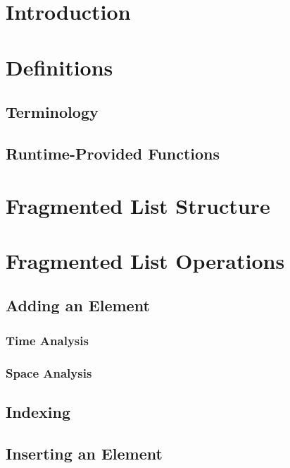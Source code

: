 \documentclass{article}
\begin{document}
	\begin{abstract}
	\end{abstract}

	\section{Introduction}

	\section{Definitions}
	
	\subsection{Terminology}

	\subsection{Runtime-Provided Functions}
	
	\section{Fragmented List Structure}
	
	\section{Fragmented List Operations}
	
	\subsection{Adding an Element}
	
	\subsubsection{Time Analysis}
	
	\subsubsection{Space Analysis}
	
	\subsection{Indexing}
	
	\subsection{Inserting an Element}
	
\end{document}
